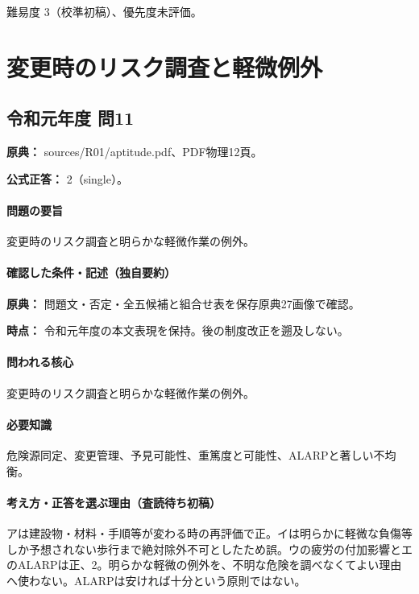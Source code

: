\par 難易度 3（校準初稿）、優先度未評価。

\section{変更時のリスク調査と軽微例外}

\subsection{令和元年度 問11}
\label{q:r01-reg-apt-11}

\noindent\textbf{原典：} sources/R01/aptitude.pdf、PDF物理12頁。

\textbf{公式正答：} 2（single）。

\paragraph{問題の要旨} 変更時のリスク調査と明らかな軽微作業の例外。

\paragraph{確認した条件・記述（独自要約）}\mbox{}\par

\noindent\textbf{原典：} 問題文・否定・全五候補と組合せ表を保存原典27画像で確認。\par

\noindent\textbf{時点：} 令和元年度の本文表現を保持。後の制度改正を遡及しない。\par

\paragraph{問われる核心} 変更時のリスク調査と明らかな軽微作業の例外。

\paragraph{必要知識} 危険源同定、変更管理、予見可能性、重篤度と可能性、ALARPと著しい不均衡。

\paragraph{考え方・正答を選ぶ理由（査読待ち初稿）} アは建設物・材料・手順等が変わる時の再評価で正。イは明らかに軽微な負傷等しか予想されない歩行まで絶対除外不可としたため誤。ウの疲労の付加影響とエのALARPは正、2。明らかな軽微の例外を、不明な危険を調べなくてよい理由へ使わない。ALARPは安ければ十分という原則ではない。

